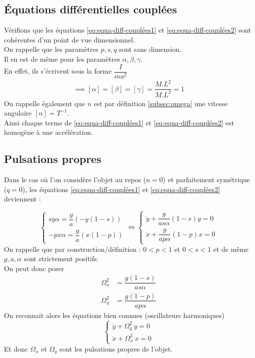 \documentclass[12pt,a4paper]{article}
\begin{document}
	\subsection{Équations différentielles couplées}
	\label{subsec:dimension-equations}
	Vérifions que les équations \eqref{eq:equa-diff-couplées1} et \eqref{eq:equa-diff-couplées2} sont cohérentes d'un point de vue dimensionnel.\\
	On rappelle que les paramètres $p,s,q$ sont sans dimension.\\
	Il en est de même pour les paramètres $\alpha,\beta,\gamma$.\\
	En effet, ils s'écrivent sous la forme $\dfrac{I}{ma^2}$
	\begin{align*}
	\implies [\alpha]=[\beta]=[\gamma]=\dfrac{M.L^2}{M.L^2}=1
	\end{align*}
	On rappelle également que $n$ est par définition \eqref{subsec:omega} une vitesse angulaire $[n]=T^{-1}$.\\
	Ainsi chaque terme de \eqref{eq:equa-diff-couplées1} et \eqref{eq:equa-diff-couplées2} est homogène à une accélération.
	
	\subsection{Pulsations propres}
	\label{subsec:pulsations-propres}
	Dans le cas où l'on considère l'objet au repos ($n=0$) et parfaitement symétrique ($q=0$), les équations \eqref{eq:equa-diff-couplées1} et \eqref{eq:equa-diff-couplées2} deviennent :
	
	\[
	\begin{cases}
	s\ddot{y}\alpha=\dfrac{g}{a}(-y(1-s))\\[2ex]
	-p\ddot{x}\alpha=\dfrac{g}{a}(x(1-p))
	\end{cases}
	\iff
	\begin{cases}
	\ddot{y}+\dfrac{g}{as\alpha}(1-s)y=0\\[2ex]
	\ddot{x}+\dfrac{g}{ap\alpha}(1-p)x=0
	\end{cases}
	\]
	On rappelle que par construction/définition : $0<p<1$ et $0<s<1$ et de même $g,a,\alpha$ sont strictement positifs.\\
	
	On peut donc poser
	\begin{align*}
	\Omega_x^2&=\dfrac{g(1-s)}{as\alpha}\\[2ex]
	\Omega_y^2&=\dfrac{g(1-p)}{ap\alpha}
	\end{align*}
	On reconnait alors les équations bien connues (oscillateurs harmoniques)
	\[
	\begin{cases}
	\ddot{y}+\Omega_y^2\ y=0\\[2ex]
	\ddot{x}+\Omega_x^2\ x=0
	\end{cases}
	\]
	Et donc $\Omega_x$ et $\Omega_y$ sont les pulsations propres de l'objet.
\end{document}

